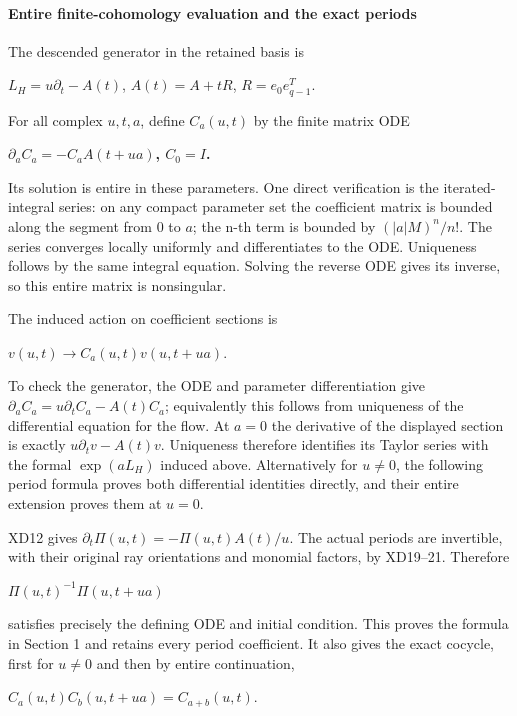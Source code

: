 \paragraph{Entire finite-cohomology evaluation and the exact periods}\label{endpoint-f1_scaling--entire-finite-cohomology-evaluation-and-the-exact-periods}

The descended generator in the retained basis is

\(L_H=u \partial_t-A(t)\), \(A(t)=A+tR\), \(R=e_0 e_{q-1}^T\).

For all complex \(u,t,a\), define \(C_a(u,t)\) by the finite matrix ODE

\textbf{\(\partial_a C_a=-C_a A(t+ua)\), \(C_0=I\).}

Its solution is entire in these parameters. One direct verification is the iterated-integral series: on any compact parameter set the coefficient matrix is bounded along the segment from \(0\) to \(a\); the n-th term is bounded by \((|a|M)^n/n!\). The series converges locally uniformly and differentiates to the ODE. Uniqueness follows by the same integral equation. Solving the reverse ODE gives its inverse, so this entire matrix is nonsingular.

The induced action on coefficient sections is

\(v(u,t) \to  C_a(u,t) v(u,t+ua)\).

To check the generator, the ODE and parameter differentiation give \(\partial_a C_a=u \partial_t C_a-A(t)C_a\); equivalently this follows from uniqueness of the differential equation for the flow. At \(a=0\) the derivative of the displayed section is exactly \(u \partial_t v-A(t)v\). Uniqueness therefore identifies its Taylor series with the formal \(\exp(aL_H)\) induced above. Alternatively for \(u\ne 0\), the following period formula proves both differential identities directly, and their entire extension proves them at \(u=0\).

XD12 gives \(\partial_t \Pi(u,t)=-\Pi(u,t)A(t)/u\). The actual periods are invertible, with their original ray orientations and monomial factors, by XD19--21. Therefore

\(\Pi(u,t)^{-1}\Pi(u,t+ua)\)

satisfies precisely the defining ODE and initial condition. This proves the formula in Section 1 and retains every period coefficient. It also gives the exact cocycle, first for \(u\ne 0\) and then by entire continuation,

\(C_a(u,t) C_b(u,t+ua)=C_{a+b}(u,t)\).

